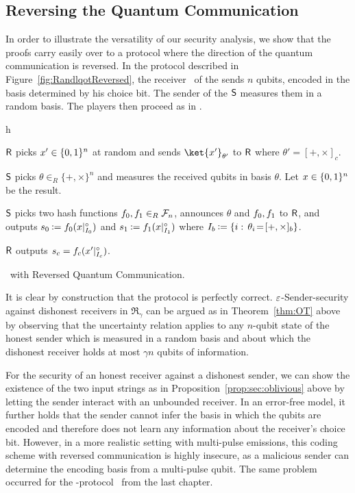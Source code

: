 \subsection{Reversing the Quantum Communication}
In order to illustrate the versatility of our security analysis, we
show that the proofs carry easily over to a protocol where the
direction of the quantum communication is reversed. In the protocol
described in Figure~\ref{fig:RandlqotReversed}, the receiver \R\ of
the \RandOT sends $n$ qubits, encoded in the basis determined by his
choice bit.  The sender of the \RandOT $\S$ measures them in a random
basis.  The players then proceed as in \Randqot.
\begin{myfigure}{h}
\begin{myprotocol}{\Randlqot}
\item $\R$ picks $x' \in \set{0,1}^n$ at random and sends
  $\ket{x'}_{\theta'}$ to $\R$ where $\theta'=[+,\times]_{c}$.
\item $\S$ picks $\theta \in_R \{+,\times \}^n$ 
and measures the received qubits in basis $\theta$. Let $x \in
\set{0,1}^n$ be the result.
\item $\S$ picks two hash functions $\hf_0,\hf_1 \in_R \chf{n}$,
  announces $\theta$ and $\hf_0, \hf_1$ to $\R$, and outputs $s_0
  \assign \hf_0(x \pad_{I_0})$ and $s_1 \assign \hf_1(x \pad_{I_1})$ where
  $I_b \assign \Set{i}{\theta_i \!=\! [+,\times]_b}$. 
\item $\R$ outputs $s_{c} = \hf_{c}(x' \pad_{I_{c}})$.
\end{myprotocol}
\caption{\Randlqot\ with Reversed Quantum Communication.}\label{fig:RandlqotReversed}
\end{myfigure}

It is clear by construction that the protocol is perfectly
correct. $\eps$-Sender-security against dishonest receivers in $\mathfrak{R}_\gamma$ can
be argued as in Theorem~\ref{thm:OT} above by observing that the
uncertainty relation applies to any $n$-qubit state of the honest
sender which is measured in a random basis and about which the
dishonest receiver holds at most $\gamma n$ qubits of information.

For the security of an honest receiver against a dishonest sender, we
can show the existence of the two input strings as in
Proposition~\ref{prop:sec:oblivious} above by letting the sender
interact with an unbounded receiver. In an error-free model, it
further holds that the sender cannot infer the basis in which the
qubits are encoded and therefore does not learn any information about
the receiver's choice bit. However, in a more realistic setting with
multi-pulse emissions, this coding scheme with reversed communication
is highly insecure, as a malicious sender can determine the encoding
basis from a multi-pulse qubit. The same problem occurred for the
\RabinOT-protocol \qot\ from the last chapter.
 



